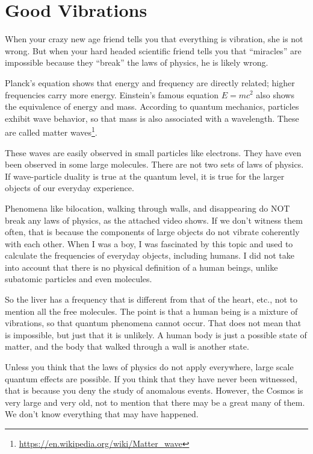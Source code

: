 \section{Good Vibrations}

When your crazy new age friend tells you that everything is vibration, she is not wrong. But when your hard headed scientific friend tells you that ``miracles'' are impossible because they ``break'' the laws of physics, he is likely wrong.

Planck's equation shows that energy and frequency are directly related; higher frequencies carry more energy. Einstein's famous equation $E=mc^2$ also shows the equivalence of energy and mass. According to quantum mechanics, particles exhibit wave behavior, so that mass is also associated with a wavelength. These are called matter waves\footnote{\url{https://en.wikipedia.org/wiki/Matter\_wave}}.

These waves are easily observed in small particles like electrons. They have even been observed in some large molecules. There are not two sets of laws of physics. If wave-particle duality is true at the quantum level, it is true for the larger objects of our everyday experience.

Phenomena like bilocation, walking through walls, and disappearing do NOT break any laws of physics, as the attached video shows. If we don't witness them often, that is because the components of large objects do not vibrate coherently with each other. When I was a boy, I was fascinated by this topic and used to calculate the frequencies of everyday objects, including humans. I did not take into account that there is no physical definition of a human beings, unlike subatomic particles and even molecules.

So the liver has a frequency that is different from that of the heart, etc., not to mention all the free molecules. The point is that a human being is a mixture of vibrations, so that quantum phenomena cannot occur. That does not mean that is impossible, but just that it is unlikely. A human body is just a possible state of matter, and the body that walked through a wall is another state.

Unless you think that the laws of physics do not apply everywhere, large scale quantum effects are possible. If you think that they have never been witnessed, that is because you deny the study of anomalous events. However, the Cosmos is very large and very old, not to mention that there may be a great many of them. We don't know everything that may have happened.

